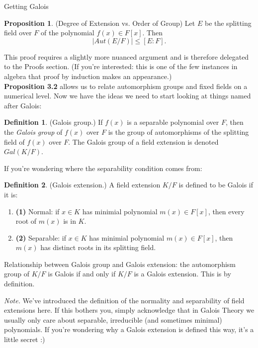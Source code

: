 \documentclass[12pt]{article}
\theoremstyle{definition}
\newtheorem{definition}{Definition}[section]
\theoremstyle{definition}
\theoremstyle{definition}
\theoremstyle{definition}
\theoremstyle{definition}
\newtheorem{proposition}{Proposition}[section]
\theoremstyle{definition}
\begin{document}
\begin{section}{Getting Galois}
    \begin{proposition}{(Degree of Extension vs. Order of Group)}
        Let \(E\) be the splitting field over \(F\) of the polynomial \(f(x) \in F[x]\). Then 
        \[\left|Aut(E/F)\right| \leq [E:F].\]
    \end{proposition}
    This proof requires a slightly more nuanced argument and is therefore delegated to the Proofs section. (If you're interested: this is one of the few instances 
    in algebra that proof by induction makes an appearance.)\\
    \break
    \textbf{Proposition 3.2} allows us to relate automorphism groups and fixed fields on a numerical level. Now we have the ideas we need to start looking at things
    named after Galois:

    \begin{definition}{(Galois group.)}
        If \(f(x)\) is a separable polynomial over \(F\), then the \textit{Galois group} of \(f(x)\) over \(F\)
        is the group of automorphisms of the splitting field of \(f(x)\) over \(F\). The Galois group of a field extension is denoted 
        \(Gal(K/F)\).
    \end{definition}

    If you're wondering where the separability condition comes from:

    \begin{definition}{(Galois extension.)}
        A field extension \(K/F\) is defined to be Galois if it is:
        \begin{enumerate}
            \item \textbf{(1)} Normal: if \(x\in K\) has minimial polynomial \(m(x) \in F[x]\), then every root of \(m(x)\) is in \(K\).
            \item \textbf{(2)} Separable: if \(x\in K\) has minimial polynomial \(m(x) \in F[x]\), then \(m(x)\) has distinct roots in its splitting field.
        \end{enumerate}
        Relationship between Galois group and Galois extension: the automorphism group of \(K/F\) is Galois if and only if \(K/F\) is a Galois extension. This 
        is by definition.
    \end{definition}

    \textit{Note.} We've introduced the definition of the normality and separability of field extensions here. If this bothers you, simply acknowledge that in 
    Galois Theory we usually only care about separable, irreducible (and sometimes minimal) polynomials. If you're wondering why a Galois extension is defined this way,
    it's a little secret :)\\


\end{section}
\end{document}
